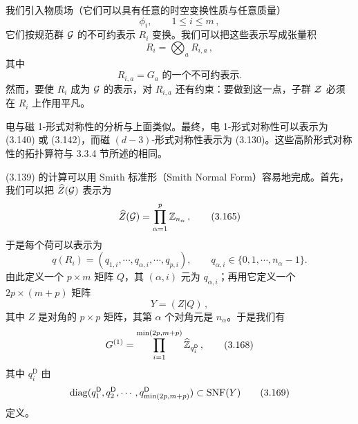 
我们引入物质场（它们可以具有任意的时空变换性质与任意质量）
\begin{equation}
    \phi_i ,\qquad 1 \le i \le m \,,
    \tag{3.162}
\end{equation}
它们按规范群 $\mathcal{G}$ 的不可约表示 $R_i$ 变换。我们可以把这些表示写成张量积
\begin{equation}
    R_i = \bigotimes_a R_{i,a} \,,
    \tag{3.163}
\end{equation}
其中
\begin{equation}
    R_{i,a} = \text{$G_a$ 的一个不可约表示} .
    \tag{3.164}
\end{equation}
然而，要使 $R_i$ 成为 $\mathcal{G}$ 的表示，对 $R_{i,a}$ 还有约束：要做到这一点，子群 $\mathcal{Z}$ 必须在 $R_i$ 上作用平凡。

电与磁 1-形式对称性的分析与上面类似。最终，电 1-形式对称性可以表示为 (3.140) 或 (3.142)，而磁 $(d-3)$-形式对称性表示为 (3.130)。这些高阶形式对称性的拓扑算符与 3.3.4 节所述的相同。

(3.139) 的计算可以用 Smith 标准形（Smith Normal Form）容易地完成。首先，我们可以把 $\widehat{Z}(\mathcal{G})$ 表示为
\begin{equation}
    \widehat{Z}(\mathcal{G}) = \prod_{\alpha=1}^{p} \mathbb{Z}_{n_\alpha} \,,
    \tag{3.165}
\end{equation}
于是每个荷可以表示为
\begin{equation}
    q(R_i) = (q_{1,i}, \cdots, q_{\alpha,i}, \cdots, q_{p,i}) ,\qquad q_{\alpha,i} \in \{0,1,\cdots,n_\alpha-1\} .
    \tag{3.166}
\end{equation}
由此定义一个 $p \times m$ 矩阵 $Q$，其 $(\alpha,i)$ 元为 $q_{\alpha,i}$；再用它定义一个 $2p \times (m+p)$ 矩阵
\begin{equation}
    Y = (Z|Q) \,,
    \tag{3.167}
\end{equation}
其中 $Z$ 是对角的 $p \times p$ 矩阵，其第 $\alpha$ 个对角元是 $n_\alpha$。于是我们有
\begin{equation}
    G^{(1)} = \prod_{i=1}^{\min(2p,m+p)} \widehat{\mathbb{Z}}_{q_i^{\mathsf{D}}} \,,
    \tag{3.168}
\end{equation}
其中 $q_i^{\mathsf{D}}$ 由
\begin{equation}
    \operatorname{diag}(q_1^{\mathsf{D}}, q_2^{\mathsf{D}}, \cdots, q_{\min(2p,m+p)}^{\mathsf{D}}) \subset \mathrm{SNF}(Y)
    \tag{3.169}
\end{equation}
定义。



